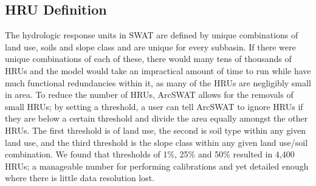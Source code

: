 \subsection{HRU Definition}\label{sec:hru_definition}

The hydrologic response units in SWAT are defined by unique combinations of land use, soils and slope class and are unique for every subbasin. If there were unique combinations of each of these, there would many tens of thousands of HRUs and the model would take an impractical amount of time to run while have much functional redundancies within it, as many of the HRUs are negligibly small in area. To reduce the number of HRUs, ArcSWAT allows for the removals of small HRUs; by setting a threshold, a user can tell ArcSWAT to ignore HRUs if they are below a certain threshold and divide the area equally amongst the other HRUs. The first threshold is of land use, the second is soil type within any given land use, and the third threshold is the slope class within any given land use/soil combination. We found that thresholds of 1\%, 25\% and 50\% resulted in 4,400 HRUs; a manageable number for performing calibrations and yet detailed enough where there is little data resolution lost.